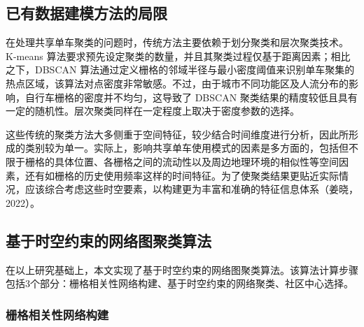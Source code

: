 \documentclass[12pt,a4paper,oneside]{ctexart}
\begin{document}
\subsection{已有数据建模方法的局限}

在处理共享单车聚类的问题时，传统方法主要依赖于划分聚类和层次聚类技术。K-means 算法要求预先设定聚类的数量，并且其聚类过程仅基于距离因素；相比之下，DBSCAN 算法通过定义栅格的邻域半径与最小密度阈值来识别单车聚集的热点区域，该算法对点密度非常敏感。不过，由于城市不同功能区及人流分布的影响，自行车栅格的密度并不均匀，这导致了 DBSCAN 聚类结果的精度较低且具有一定的随机性。层次聚类同样在一定程度上取决于密度参数的选择。

这些传统的聚类方法大多侧重于空间特征，较少结合时间维度进行分析，因此所形成的类别较为单一。实际上，影响共享单车使用模式的因素是多方面的，包括但不限于栅格的具体位置、各栅格之间的流动性以及周边地理环境的相似性等空间因素，还有如栅格的历史使用频率这样的时间特征。为了使聚类结果更贴近实际情况，应该综合考虑这些时空要素，以构建更为丰富和准确的特征信息体系（姜晓，2022）\cite{姜晓2022潮汐}。

\subsection{基于时空约束的网络图聚类算法}

在以上研究基础上，本文实现了基于时空约束的网络图聚类算法\cite{姜晓2022潮汐}。该算法计算步骤包括3个部分：栅格相关性网络构建、基于时空约束的网络聚类、社区中心选择。

\subsubsection{栅格相关性网络构建}
\end{document}
